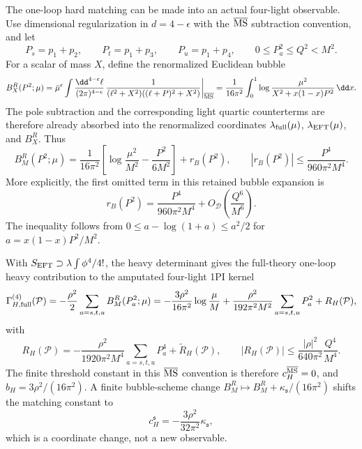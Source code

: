 The one-loop hard matching can be made into an actual four-light observable.
Use dimensional regularization in \(d=4-\epsilon\) with the
\(\overline{\rm MS}\) subtraction convention, and let
\[
  P_s=p_1+p_2,\qquad P_t=p_1+p_3,\qquad P_u=p_1+p_4,
  \qquad 0\le P_a^2\le Q^2<M^2 .
\]
For a scalar of mass \(X\), define the renormalized Euclidean bubble
\begin{equation}
  B_X^R(P^2;\mu)
  =
  \bar\mu^\epsilon
  \int\frac{\dd^{4-\epsilon}\ell}{(2\pi)^{4-\epsilon}}\,
  \frac{1}{(\ell^2+X^2)((\ell+P)^2+X^2)}
  \bigg|_{\overline{\rm MS}}
  =
  \frac1{16\pi^2}
  \int_0^1
  \log\frac{\mu^2}{X^2+x(1-x)P^2}\,\dd x .
  \label{eq:heavy-light-msbar-bubble}
\end{equation}
The pole subtraction and the corresponding light quartic counterterms are
therefore already absorbed into the renormalized coordinates
\(\lambda_{\rm full}(\mu)\), \(\lambda_{\rm EFT}(\mu)\), and \(B_X^R\).
Thus
\begin{equation}
  B_M^R(P^2;\mu)
  =
  \frac1{16\pi^2}
  \left[
    \log\frac{\mu^2}{M^2}
    -
    \frac{P^2}{6M^2}
  \right]
  +
  r_B(P^2),
  \qquad
  |r_B(P^2)|
  \le
  \frac{P^4}{960\pi^2M^4}.
  \label{eq:heavy-light-bubble-low-momentum-expansion}
\end{equation}
More explicitly, the first omitted term in this retained bubble expansion is
\[
  r_B(P^2)
  =
  \frac{P^4}{960\pi^2M^4}
  +
  O_{\mathcal D}\!\left(\frac{Q^6}{M^6}\right).
\]
The inequality follows from
\(0\le a-\log(1+a)\le a^2/2\) for
\(a=x(1-x)P^2/M^2\).

With \(S_{\rm EFT}\supset\lambda\int\phi^4/4!\), the heavy determinant gives
the full-theory one-loop heavy contribution to the amputated four-light
1PI kernel
\begin{equation}
  \Gamma_{H,\rm full}^{(4)}(\mathcal P)
  =
  -\frac{\rho^2}{2}
  \sum_{a=s,t,u}B_M^R(P_a^2;\mu)
  =
  -\frac{3\rho^2}{16\pi^2}\log\frac{\mu}{M}
  +
  \frac{\rho^2}{192\pi^2M^2}
  \sum_{a=s,t,u}P_a^2
  +
  R_H(\mathcal P),
  \label{eq:heavy-light-heavy-loop-amplitude}
\end{equation}
with
\[
  R_H(\mathcal P)
  =
  -\frac{\rho^2}{1920\pi^2M^4}
  \sum_{a=s,t,u}P_a^4
  +
  \widetilde R_H(\mathcal P),
  \qquad
  |R_H(\mathcal P)|
  \le
  \frac{|\rho|^2}{640\pi^2}\frac{Q^4}{M^4}.
\]
The finite threshold constant in this \(\overline{\rm MS}\) convention is
therefore \(c_H^{\overline{\rm MS}}=0\), and
\(b_H=3\rho^2/(16\pi^2)\).  A finite bubble-scheme change
\(B_M^R\mapsto B_M^R+\kappa_{\mathfrak s}/(16\pi^2)\) shifts the matching
constant to
\[
  c_H^{\mathfrak s}
  =
  -\frac{3\rho^2}{32\pi^2}\kappa_{\mathfrak s},
\]
which is a coordinate change, not a new observable.

